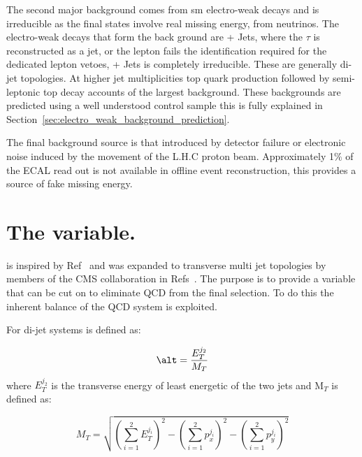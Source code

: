 The second major background comes from \ac{sm} electro-weak decays and 
is irreducible as the final states involve real missing energy, from 
neutrinos. The electro-weak decays that form the back ground are 
\HepProcess{\PW\to\Ptau\Pnu} + Jets, where the $\tau$ is reconstructed as a 
jet, or the lepton fails the identification required for the dedicated lepton 
vetoes, \HepProcess{\PZ\to\Pnu\APnu} + Jets is completely irreducible. These 
are generally di-jet topologies. At higher jet multiplicities top quark 
production followed by semi-leptonic top decay accounts of the largest 
background. These backgrounds are predicted using a well understood control 
sample this is fully explained in 
Section~\ref{sec:electro_weak_background_prediction}.


The final background source is that introduced by detector failure or 
electronic noise induced by the movement of the L.H.C proton beam.
Approximately 1$\%$ of the ECAL read out is not available in offline event 
reconstruction, this provides a source of fake missing energy.

\section{The \alt variable.} %
\label{sec:the_alpha___t_variable_}
\alt is inspired by Ref~\cite{Randall:2008dk} and was expanded to transverse 
multi jet topologies by members of the CMS collaboration in 
Refs~\cite{cms-pas-sus-08005,cms-pas-sus-09001}. The purpose is to provide a 
variable that can be cut on to eliminate QCD from the final selection. To do 
this the inherent balance of the QCD system is exploited.

For di-jet systems \alt is defined as:

\begin{equation}
  \alt = \frac{E_{T}^{j_{2}}}{M_{T}}
\end{equation}
where $E_{T}^{j_{2}}$ is the transverse energy of least energetic of the two jets 
and M$_{T}$ is defined as:

\begin{equation}
  M_{T} = \sqrt{\left(\sum^{2}_{i=1}E_{T}^{j_{i}}\right)^{2} - \left(\sum^{2}_{i=1}p_{x}^{j_{i}}\right)^{2} - \left(\sum^{2}_{i=1}p_{y}^{j_{i}}\right)^{2}}
\end{equation}

